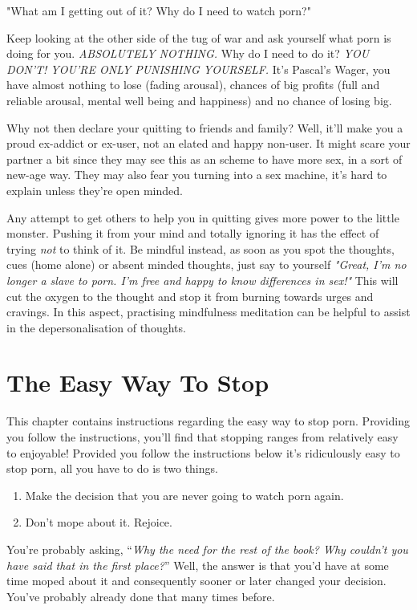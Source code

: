 \documentclass[
]{book}
\begin{document}
"What am I getting out of it? Why do I need to watch porn?"

Keep looking at the other side of the tug of war and ask yourself what porn is doing for you. \emph{ABSOLUTELY NOTHING.} Why do I need to do it? \emph{YOU DON'T! YOU'RE ONLY PUNISHING YOURSELF.} It's Pascal's Wager, you have almost nothing to lose (fading arousal), chances of big profits (full and reliable arousal, mental well being and happiness) and no chance of losing big.

Why not then declare your quitting to friends and family? Well, it'll make you a proud ex-addict or ex-user, not an elated and happy non-user. It might scare your partner a bit since they may see this as an scheme to have more sex, in a sort of new-age way. They may also fear you turning into a sex machine, it's hard to explain unless they're open minded.

Any attempt to get others to help you in quitting gives more power to the little monster. Pushing it from your mind and totally ignoring it has the effect of trying \emph{not} to think of it. Be mindful instead, as soon as you spot the thoughts, cues (home alone) or absent minded thoughts, just say to yourself \emph{"Great, I'm no longer a slave to porn. I'm free and happy to know differences in sex!"} This will cut the oxygen to the thought and stop it from burning towards urges and cravings. In this aspect, practising mindfulness meditation can be helpful to assist in the depersonalisation of thoughts.

\hypertarget{the-easy-way-to-stop}{%
\chapter{The Easy Way To Stop}\label{the-easy-way-to-stop}}

This chapter contains instructions regarding the easy way to stop porn. Providing you follow the instructions, you'll find that stopping ranges from relatively easy to enjoyable! Provided you follow the instructions below it's ridiculously easy to stop porn, all you have to do is two things.

\begin{enumerate}
\def\labelenumi{\arabic{enumi}.}
\item
  Make the decision that you are never going to watch porn again.
\item
  Don't mope about it. Rejoice.
\end{enumerate}

You're probably asking, ``\emph{Why the need for the rest of the book? Why couldn't you have said that in the first place?}'' Well, the answer is that you'd have at some time moped about it and consequently sooner or later changed your decision. You've probably already done that many times before.
\end{document}
